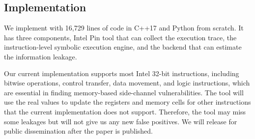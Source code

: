 \subsection{Implementation}
We implement \tool{} with 16,729 lines of code in C++17 and Python from scratch. It has three
components, Intel Pin tool that can collect the execution trace, the
instruction-level symbolic execution engine, and the backend that can estimate
the information leakage. 


Our current implementation supports most Intel 32-bit instructions,
including bitwise operations, control transfer, data movement, and logic
instructions, which are essential in finding memory-based side-channel
vulnerabilities. The tool will use the real values to update the registers and memory
cells for other instructions that the current implementation does not support. 
Therefore, the tool may miss some leakages but will not give us any new false positives. 
We will release \tool{} for public dissemination
after the paper is published.
